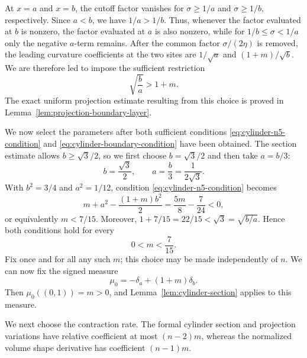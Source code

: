 \documentclass[11pt]{article}
\theoremstyle{remark}
\begin{document}
At $x=a$ and $x=b$, the cutoff factor vanishes for
$\sigma\geq1/a$ and $\sigma\geq1/b$, respectively.  Since $a<b$, we have
$1/a>1/b$.  Thus, whenever the factor evaluated at $b$ is nonzero, the
factor evaluated at $a$ is also nonzero, while for
$1/b\leq\sigma<1/a$ only the negative $a$-term remains.  After the common
factor $\sigma/(2\eta)$ is removed, the leading curvature coefficients at
the two sites are $1/\sqrt a$ and $(1+m)/\sqrt b$.  We are therefore led
to impose the sufficient restriction
\begin{equation}\label{eq:cylinder-boundary-condition}
 \sqrt{\frac ba}>1+m.
\end{equation}
The exact uniform projection estimate resulting from this choice is proved
in Lemma~\ref{lem:projection-boundary-layer}.

We now select the parameters after both sufficient conditions 
\eqref{eq:cylinder-n5-condition} and
\eqref{eq:cylinder-boundary-condition} have been obtained.  The section
estimate allows $b\geq\sqrt3/2$, so we first choose
$b=\sqrt3/2$ and then take $a=b/3$:
\begin{equation}\label{eq:cylinder-parameter-values}
 b=\frac{\sqrt3}{2},\qquad
 a=\frac b3=\frac1{2\sqrt3}.
\end{equation}
With $b^2=3/4$ and $a^2=1/12$, condition
\eqref{eq:cylinder-n5-condition} becomes
\[
 m+a^2-\frac{(1+m)b^2}{2}
 =\frac{5m}{8}-\frac7{24}<0,
\]
or equivalently $m<7/15$.  Moreover,
$1+7/15=22/15<\sqrt3=\sqrt{b/a}$.  Hence both conditions hold for every
\begin{equation}\label{eq:cylinder-m-range}
 0<m<\frac7{15}.
\end{equation}
Fix once and for all any such $m$; this choice may be made independently of
$n$.  We can now fix the signed measure
\begin{equation}\label{eq:cylinder-point-variation}
 \mu_0=-\delta_a+(1+m)\delta_b.
\end{equation}
Then $\mu_0((0,1))=m>0$, and
Lemma~\ref{lem:cylinder-section} applies to this measure.

We next choose the contraction rate.  The formal cylinder section and
projection variations have relative coefficient at most $(n-2)m$, whereas
the normalized volume shape derivative has coefficient $(n-1)m$.
\end{document}
